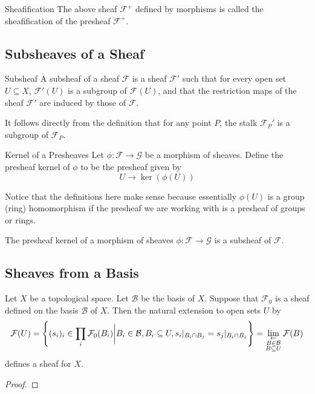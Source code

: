 \documentclass[a4paper]{article}
\begin{document}
\begin{defn}{Sheafification}{} The above sheaf $\mathcal{F}^+$ defined by morphisms is called the sheafification of the presheaf $\mathcal{F}^+$. 
\end{defn}


\subsection{Subsheaves of a Sheaf}
\begin{defn}{Subsheaf}{} A subsheaf of a sheaf $\mathcal{F}$ is a sheaf $\mathcal{F}'$ such that for every open set $U\subseteq X$, $\mathcal{F}'(U)$ is a subgroup of $\mathcal{F}(U)$, and that the restriction maps of the sheaf $\mathcal{F}'$ are induced by those of $\mathcal{F}$. 
\end{defn}

It follows directly from the definition that for any point $P$, the stalk $\mathcal{F}_P'$ is a subgroup of $\mathcal{F}_P$. 

\begin{defn}{Kernel of a Presheaves}{} Let $\phi:\mathcal{F}\to\mathcal{G}$ be a morphism of sheaves. Define the presheaf kernel of $\phi$ to be the presheaf given by $$U\to\ker(\phi(U))$$ 
\end{defn}

Notice that the definitions here make sense because essentially $\phi(U)$ is a group (ring) homomorphism if the presheaf we are working with is a presheaf of groups or rings. 

\begin{prp}{}{} The presheaf kernel of a morphism of sheaves $\phi:\mathcal{F}\to\mathcal{G}$ is a subsheaf of $\mathcal{F}$. 
\end{prp}

\subsection{Sheaves from a Basis}
\begin{thm}{}{} Let $X$ be a topological space. Let $\mathcal{B}$ be the basis of $X$. Suppose that $\mathcal{F}_0$ is a sheaf defined on the basis $\mathcal{B}$ of $X$. Then the natural extension to open sets $U$ by $$\mathcal{F}(U)=\left\{(s_i)_i\in\prod_i\mathcal{F}_0(B_i)\bigg{|}B_i\in\mathcal{B}, B_i\subseteq U, s_i|_{B_i\cap B_j}=s_j|_{B_i\cap B_j}\right\}=\lim_{\substack{\leftarrow\\B\in\mathcal{B}\\B\subseteq U}}\mathcal{F}(B)$$ defines a sheaf for $X$. \tcbline
\begin{proof}

\end{proof}
\end{thm}
\end{document}
